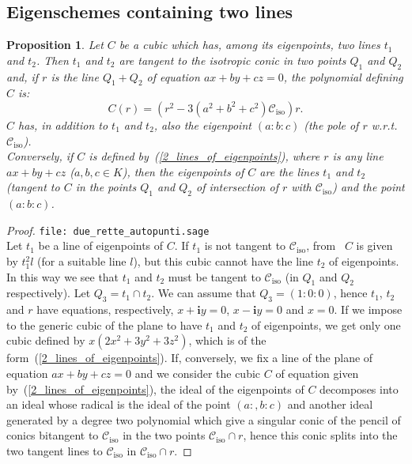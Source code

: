 \documentclass{amsart}
\theoremstyle{plain}
\newtheorem{prop}[lemma]{Proposition}
\theoremstyle{definition}
\newcommand{\iso}{\mathcal{C}_{\mathrm{iso}}}
\newcommand{\iii}{\textbf{i}}
\begin{document}
\subsection{Eigenschemes containing two lines}
\begin{prop}
\label{cubiche_con_2_rette}
Let $C$ be a cubic which has, among its eigenpoints, two lines $t_1$
and $t_2$. Then $t_1$ and $t_2$ are tangent to the isotropic conic
in two points $Q_1$ and $Q_2$ and, if $r$ is the line $Q_1+Q_2$
of equation $ax+by+cz=0$, the polynomial defining $C$ is:
\begin{equation}
C(r) = \left(r^2-3\left(a^2+b^2+c^2\right)\iso\right)r.
\label{2_lines_of_eigenpoints}
\end{equation}
$C$ has, in addition to $t_1$ and $t_2$, also the eigenpoint $(a: b: c)$
(the pole of $r$ w.r.t.\ $\iso$). \\
Conversely, if $C$ is defined by~(\ref{2_lines_of_eigenpoints}), where
$r$ is any line $ax+by+cz$ ($a, b, c \in K$), then
the eigenpoints of $C$ are the lines $t_1$ and $t_2$ (tangent to $C$
in the points $Q_1$ and $Q_2$ of intersection of $r$ with $\iso$) and
the point $(a: b: c)$.
\end{prop}
\begin{proof}
\verb+file: due_rette_autopunti.sage+\\
Let $t_1$ be a line of eigenpoints of $C$. If $t_1$ is not tangent
to $\iso$, from~ $C$ is given by $t_1^2l$ (for
a suitable line $l$), but this cubic cannot have the line $t_2$
of eigenpoints.
In this way we see that $t_1$ and $t_2$ must be tangent to $\iso$ (in
$Q_1$ and $Q_2$ respectively). Let $Q_3 = t_1 \cap t_2$. We can assume
that $Q_3 = (1: 0: 0)$, hence $t_1$, $t_2$ and $r$ have equations,
respectively, $x+\iii y=0$, $x-\iii y = 0$ and  $x=0$.
If we impose to the generic cubic of the plane to have
$t_1$ and $t_2$ of eigenpoints, we get only one cubic defined by
$x(2x^2 + 3y^2 + 3z^2)$, which is of the
form~(\ref{2_lines_of_eigenpoints}). If, conversely, we fix a line
of the plane of equation $ax+by+cz=0$ and we consider the cubic $C$ of
equation given by~(\ref{2_lines_of_eigenpoints}), the ideal of
the eigenpoints of $C$ decomposes into an ideal whose radical is
the ideal of the point $(a:, b: c)$ and another ideal generated by
a degree two polynomial which give a singular conic of the pencil
of conics bitangent to $\iso$ in the two points $\iso \cap r$, hence
this conic splits into the two tangent lines to $\iso$ in $\iso \cap r$.
\end{proof}
\end{document}

